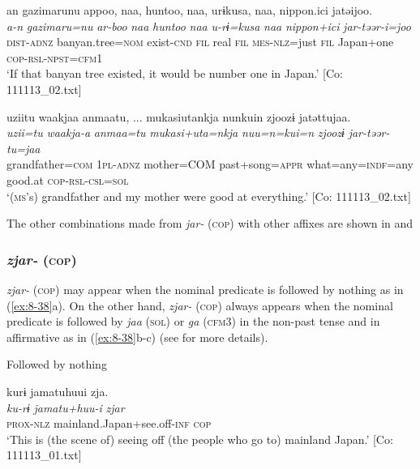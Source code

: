 \ea
{\TM}
\glll  an  gazimarunu  appoo,  naa,  huntoo,  naa,   urɨkusa,  naa,  {\textbar}nippon.ici{\textbar}  jatəijoo.\\
\textit{a-n}  \textit{gazimaru=nu}  \textit{ar-boo}  \textit{naa}  \textit{huntoo}  \textit{naa}  \textit{u-rɨ=kusa}  \textit{naa}  \textit{nippon+ici}  \textit{jar-təər-i=joo}
\\
\textsc{dist}-\textsc{adnz}  banyan.tree=\textsc{nom}  exist-\textsc{cnd}  \textsc{fil}  real  \textsc{fil}   \textsc{mes}-\textsc{nlz}=just  \textsc{fil}  Japan+one  \textsc{cop}-\textsc{rsl}-\textsc{npst}=\textsc{cfm1}\\
\glt ‘If that banyan tree existed, it would be number one in Japan.’ [Co: 111113\_02.txt]



\ex  {\TM}
\glll  uziitu  waakjaa  anmaatu, ...  mukasiutankja    nunkuin  zjoozɨ  jatəttujaa.\\
\textit{uzii=tu}  \textit{waakja-a}  \textit{anmaa=tu}  \textit{mukasi+uta=nkja}   \textit{nuu=n=kui=n}  \textit{zjoozɨ}  \textit{jar-təər-tu=jaa}\\
grandfather=\textsc{com}  1\textsc{pl}-\textsc{adnz}  mother=COM  past+song=\textsc{appr}  what=any=\textsc{indf}=any  good.at  \textsc{cop}-\textsc{rsl}-\textsc{csl}=\textsc{sol}\\
\glt ‘(\textsc{ms}’s) grandfather and my mother were good at everything.’ [Co: 111113\_02.txt]
\z
\z

  The other combinations made from \textit{jar-} (\textsc{cop}) with other affixes are shown in  and 

\subsubsection{\textit{zjar-} (\textsc{cop})}

\textit{zjar-} (\textsc{cop}) may appear when the nominal predicate is followed by nothing as in (\ref{ex:8-38}a). On the other hand, \textit{zjar-} (\textsc{cop}) always appears when the nominal predicate is followed by \textit{jaa} (\textsc{sol}) or \textit{ga} (\textsc{cfm3}) in the non-past tense and in affirmative as in (\ref{ex:8-38}b-c) (see  for more details).

\ea\label{ex:8-38}
    \ea Followed by nothing

    {\TM}
    \glll  kurɨ  jamatuhuui  zja.\\
    \textit{ku-rɨ}  \textit{jamatu+huu-i}  \textit{zjar}\\   \textsc{prox}-\textsc{nlz}  mainland.Japan+see.off-\textsc{inf}  \textsc{cop}\\
    \glt ‘This is (the scene of) seeing off (the people who go to) mainland Japan.’ [Co: 111113\_01.txt]


